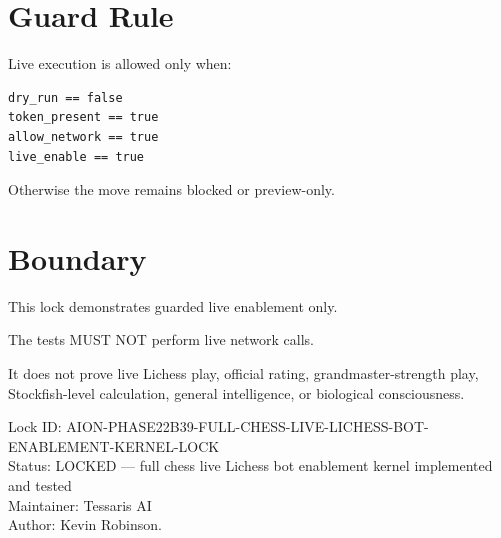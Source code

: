 \documentclass[11pt,a4paper]{article}
\begin{document}
\section{Guard Rule}

Live execution is allowed only when:

\begin{verbatim}
dry_run == false
token_present == true
allow_network == true
live_enable == true
\end{verbatim}

Otherwise the move remains blocked or preview-only.

\section{Boundary}

This lock demonstrates guarded live enablement only.

The tests MUST NOT perform live network calls.

It does not prove live Lichess play, official rating, grandmaster-strength play, Stockfish-level calculation, general intelligence, or biological consciousness.

\bigskip

\noindent
Lock ID: AION-PHASE22B39-FULL-CHESS-LIVE-LICHESS-BOT-ENABLEMENT-KERNEL-LOCK\\
Status: LOCKED --- full chess live Lichess bot enablement kernel implemented and tested\\
Maintainer: Tessaris AI\\
Author: Kevin Robinson.
\end{document}
